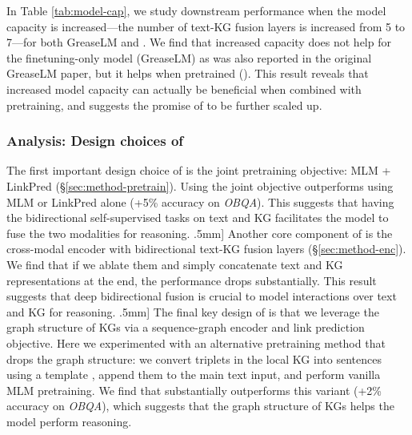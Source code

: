 In Table \ref{tab:model-cap}, we study downstream performance when the model capacity is increased---the number of text-KG fusion layers is increased from 5 to 7---for both GreaseLM and \methodname. We find that increased capacity does not help for the finetuning-only model (GreaseLM) as was also reported in the original GreaseLM paper, but it helps when pretrained (\methodname). This result reveals that increased model capacity can actually be beneficial when combined with pretraining, and suggests the promise of \methodname to be further scaled up.



\subsubsection{Analysis: Design choices of \methodname}
\label{sec:exp-ablation}


 The first important design choice of \methodname is the joint pretraining objective: MLM + LinkPred (\S \ref{sec:method-pretrain}). Using the joint objective outperforms using MLM or LinkPred alone (+5\% accuracy on \textit{OBQA}). This suggests that having the bidirectional self-supervised tasks on text and KG facilitates the model to fuse the two modalities for reasoning.
\1.5mm]
Another core component of \methodname is the cross-modal encoder with bidirectional text-KG fusion layers (\S \ref{sec:method-enc}). We find that if we ablate them and simply concatenate text and KG representations at the end, the performance drops substantially. This result suggests that deep bidirectional fusion is crucial to model interactions over text and KG for reasoning.
\1.5mm]
The final key design of \methodname is that we leverage the graph structure of KGs via a sequence-graph encoder and link prediction objective. Here we experimented with an alternative pretraining method that drops the graph structure: we convert triplets in the local KG into sentences using a template \cite{feng2020scalable}, append them to the main text input, and perform vanilla MLM pretraining.
We find that \methodname substantially outperforms this variant (+2\% accuracy on \textit{OBQA}), which suggests that the graph structure of KGs helps the model perform reasoning.